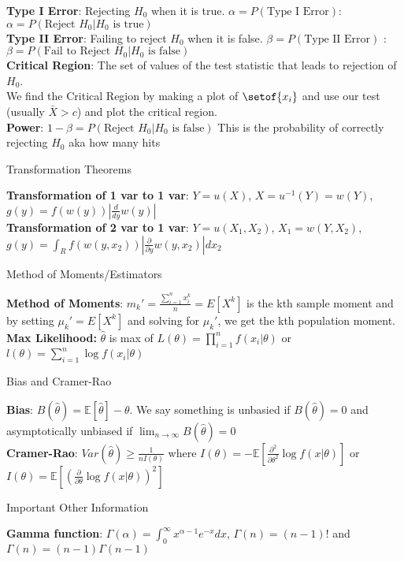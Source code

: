 \documentclass[answers,12pt,addpoints]{exam}
\begin{document}
\textbf{Type I Error}: Rejecting $H_0$ when it is true. $\alpha = P(\text{Type I Error})$: $\alpha = P(\text{Reject } H_0 | H_0 \text{ is true})$\\
\textbf{Type II Error}: Failing to reject $H_0$ when it is false. $\beta = P(\text{Type II Error})$ : $\beta = P(\text{Fail to Reject } H_0 | H_0 \text{ is false})$\\
\textbf{Critical Region}: The set of values of the test statistic that leads to rejection of $H_0$. \\
We find the Critical Region by making a plot of $\setof{x_i}$ and use our test (usually $\bar{X} > c$) and plot the critical region.\\
\textbf{Power}: $1-\beta = P(\text{Reject } H_0 | H_0 \text{ is false})$ This is the probability of correctly rejecting $H_0$ aka how many hits
\begin{center}
    Transformation Theorems
\end{center}
\textbf{Transformation of 1 var to 1 var}: $Y = u(X)$, $X = u^{-1}(Y) = w(Y)$, $g(y) =  f(w(y))|\frac{d}{dy}w(y)| $\\
\textbf{Transformation of 2 var to 1 var}: $Y = u(X_1, X_2)$, $X_1 = w(Y, X_2)$, $g(y) = \int_R f(w(y, x_2))|\frac{\partial}{\partial y}w(y, x_2)|dx_2$
\begin{center}
    Method of Moments/Estimators
\end{center}
\textbf{Method of Moments}: $m_k' = \frac{\sum_{i=1}^{n} x_i^k}{n} = E[X^k]$ is the kth sample moment and by setting $\mu_k' = E[X^k]$ and solving for $\mu_k'$, we get the kth population moment.\\
\textbf{Max Likelihood:} $\hat{\theta}$ is max of $L(\theta) = \prod_{i=1}^n f(x_i|\theta)$ or $l(\theta) = \sum_{i=1}^n \log f(x_i|\theta)$
\begin{center}
    Bias and Cramer-Rao
\end{center}
\textbf{Bias}: $B(\hat{\theta}) = \mathbb{E}[\hat{\theta}] - \theta$. We say something is unbasied if $B(\hat{\theta}) = 0$ and asymptotically unbiased if $\lim_{n\to\infty} B(\hat{\theta}) = 0$\\
\textbf{Cramer-Rao}: $Var(\hat{\theta}) \geq \frac{1}{nI(\theta)}$ where $I(\theta) = -\mathbb{E}\left[\frac{\partial^2}{\partial \theta^2}\log f(x|\theta)\right]$ or $I(\theta) = \mathbb{E}\left[\left(\frac{\partial}{\partial \theta}\log f(x|\theta)\right)^2\right]$
\begin{center}
    Important Other Information
\end{center}
\textbf{Gamma function}: $\Gamma(\alpha) = \int_0^\infty x^{\alpha-1}e^{-x}dx$, $\Gamma(n) = (n-1)!$ and $\Gamma(n) = (n-1)\Gamma(n-1)$\\
\end{document}
